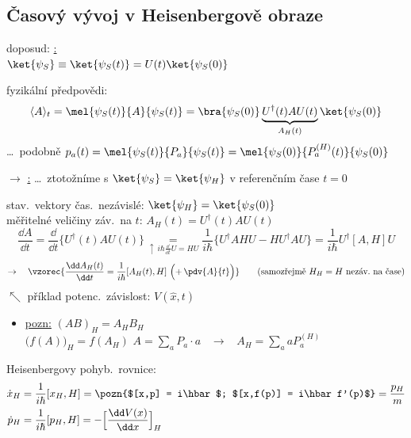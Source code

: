 \subsection{Časový vývoj v Heisenbergově obraze}
doposud: \underline{:} \\
\quad $\ket{\psi_S} \equiv \ket{\psi_S(t)} = U(t)\ket{\psi_S(0)}$ \hfill {}

fyzikální předpovědi:
\[
  \langle A\rangle_t = \mel{\psi_S(t)}{A}{\psi_S(t)} = \bra{\psi_S(0)}\underbrace{U^\dagger(t)AU(t)}_{A_H(t)}\ket{\psi_S(0)}
\]
\dots\ podobně \quad $p_a(t) = \mel{\psi_S(t)}{P_a}{\psi_S(t)} = \mel{\psi_S(0)}{P_a^{(H)}(t)}{\psi_S(0)}$

$\to$ \underline{:} \quad \dots\ ztotožníme s $\ket{\psi_S} = \ket{\psi_H}$ v referenčním čase $t = 0$

stav.\ vektory čas.\ nezávislé: \quad $\ket{\psi_H} = \ket{\psi_S(0)}$ \\
měřitelné veličiny záv.\ na $t$: \quad $A_H(t) = U^\dagger(t)AU(t)$
\[
  \frac{\dd A}{\dd t} = \frac{\dd}{\dd t}\big\{U^\dagger(t)AU(t)\big\} \underset{\uparrow\ i\hbar\frac{\dd}{\dd t}U = HU}{=}
  \frac{1}{i\hbar}\big\{U^\dagger AHU - HU^\dagger AU\big\} = \frac{1}{i\hbar}U^\dagger[A,H]U
\]
\[
  \to\quad \vzorec{\frac{\dd A_H(t)}{\dd t} = \frac{1}{i\hbar}[A_H(t),H]\ \Big({+}\,\pdv{A}{t}\Big)}
  \qquad \text{(samozřejmě $H_H = H$ nezáv.\ na čase)}
\]
 \hfill {\color{prbarva}$\nwarrow$ příklad potenc.\ závislost: $V(\hat x,t)$}

\begin{itemize}
  \item \underline{pozn:} \quad $(AB)_H = A_HB_H$ \\
         \quad $\big(f(A)\big)_H = f(A_H)$ \qquad
        $A = \sum_a P_a\cdot a$ \ $\to$ \ $A_H = \sum_a aP_a^{(H)}$
\end{itemize}

\begin{priklad}[PŘ: částice v potenc.\ poli $V(\hat x)$ \dots\ $\hat H = \frac{\hat p^2}{2m} + V(\hat x)$]
Heisenbergovy pohyb.\ rovnice:
\begin{align*}
  \dot x_H &= \frac{1}{i\hbar}[x_H,H] = \pozn{$[x,p] = i\hbar$; $[x,f(p)] = i\hbar f'(p)$} = \frac{p_H}{m} \\
  \dot p_H &= \frac{1}{i\hbar}[p_H,H] = -\Big[\frac{\dd V(x)}{\dd x}\Big]_H
\end{align*}
\end{priklad}

